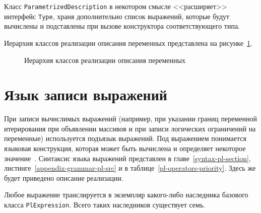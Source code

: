 \documentclass[times,specification,annotation]{style/itmo-student-thesis/itmo-student-thesis}
\begin{document}
Класс \texttt{ParametrizedDescription} в некотором смысле <<расширяет>> интерфейс \texttt{Type}, храня дополнительно список выражений, которые будут вычислены и подставлены при вызове конструктора соответствующего типа.

Иерархия классов реализации описания переменных представлена на рисунке~\ref{descriptions-classes-hierarchy}.

\begin{figure}[!h]
\caption{Иерархия классов реализации описания переменных}\label{descriptions-classes-hierarchy}
\centering
{}%

\end{figure}

\section{Язык записи выражений}

При записи вычислимых выражений (например, при указании границ переменной итерирования при объявлении массивов и при записи логических ограничений на переменные) используется подъязык выражений. Под выражением понимается языковая конструкция, которая может быть вычислена и определяет некоторое значение~\cite{mitchell2003concepts}. Синтаксис языка выражений представлен в главе~\ref{syntax-pl-section}, листинге~\ref{appendix-grammar-pl-src} и в таблице~\ref{pl-operators-priority}. Здесь же будет приведено описание реализации.

Любое выражение транслируется в экземпляр какого-либо наследника базового класса \texttt{PlExpression}. Всего таких наследников существует семь.
\end{document}
